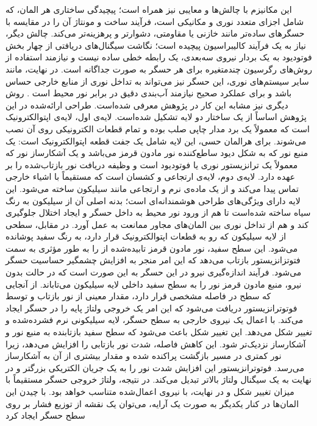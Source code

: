 این مکانیزم با چالش‌ها و معایبی نیز همراه است؛ پیچیدگی ساختاری هر المان، که شامل اجزای متعدد نوری و مکانیکی است، فرآیند ساخت و مونتاژ آن را در مقایسه با حسگرهای ساده‌تر مانند خازنی یا مقاومتی، دشوارتر و پرهزینه‌تر می‌کند. چالش دیگر، نیاز به یک فرآیند کالیبراسیون پیچیده است؛ نگاشت سیگنال‌های دریافتی از چهار بخش فوتودیود به یک بردار نیروی سه‌بعدی، یک رابطه خطی ساده نیست و نیازمند استفاده از روش‌های رگرسیون چندمتغیره برای هر حسگر به صورت جداگانه است. در نهایت، مانند سایر سیستم‌های نوری، این حسگر نیز می‌تواند به تداخل نوری از منابع خارجی حساس باشد و برای عملکرد صحیح نیازمند آب‌بندی دقیق در برابر نور محیط است
\cite{khamis_novel_2019}.
روش دیگری نیز مشابه این کار در پژوهش 
\cite{costanzo2021optical}
 معرفی شده‌است. طراحی ارائه‌شده در این پژوهش اساساً از یک ساختار دو لایه تشکیل شده‌است. لایه‌ی اول، لایه‌ی اپتوالکترونیک 
   است که معمولاً یک برد مدار چاپی صلب بوده و تمام قطعات الکترونیکی روی آن نصب می‌شوند. برای هرالمان حسی، این لایه شامل یک جفت قطعه اپتوالکترونیک است: یک منبع نور که به شکل دیود ساطع‌کننده نور مادون قرمز می‌باشد و یک آشکارساز نور که معمولاً یک ترانزیستور نوری
    یا فوتودیود است و وظیفه دریافت نور بازتاب‌‌شده را بر عهده دارد.
 لایه‌ی دوم، لایه‌ی ارتجاعی و کشسان است که مستقیماً با اشیاء خارجی تماس پیدا می‌کند و از یک ماده‌ی نرم و ارتجاعی مانند سیلیکون ساخته می‌شود. این لایه دارای ویژگی‌های طراحی هوشمندانه‌ای است؛ بدنه اصلی آن از سیلیکون به رنگ سیاه ساخته شده‌است تا هم از ورود نور محیط به داخل حسگر و ایجاد اختلال جلوگیری کند و هم از تداخل نوری
   بین المان‌های مجاور ممانعت به عمل آورد. در مقابل، سطحی از لایه سیلیکون که رو به قطعات اپتوالکترونیک قرار دارد، به رنگ سفید پوشانده می‌شود. این سطح سفید، نور مادون قرمز تابیده‌شده از  را به طور مؤثری به سمت فتوتزانزیستور بازتاب می‌دهد که این امر منجر به افزایش چشمگیر حساسیت حسگر می‌شود.
 فرآیند اندازه‌گیری نیرو در این حسگر به این صورت است که در حالت بدون نیرو، منبع مادون قرمز نور را به سطح سفید داخلی لایه سیلیکون می‌تاباند. از آنجایی که سطح در فاصله مشخصی قرار دارد، مقدار معینی از نور بازتاب و توسط فوتوترانزیستور دریافت می‌شود که این امر یک خروجی ولتاژ پایه را در حسگر ایجاد می‌کند. با اعمال یک نیروی خارجی به سطح حسگر، لایه سیلیکونی نرم فشرده‌شده و تغییر شکل می‌دهد. این تغییر شکل باعث می‌شود که سطح سفید بازتابنده به منبع نور و آشکارساز نزدیک‌تر شود. این کاهش فاصله، شدت نور بازتابی را افزایش می‌دهد، زیرا نور کمتری در مسیر بازگشت پراکنده شده و مقدار بیشتری از آن به آشکارساز می‌رسد. فوتوترانزیستور این افزایش شدت نور را به یک جریان الکتریکی بزرگتر و در نهایت به یک سیگنال ولتاژ بالاتر تبدیل می‌کند. در نتیجه، ولتاژ خروجی حسگر مستقیماً با میزان تغییر شکل و در نهایت، با نیروی اعمال‌شده متناسب خواهد بود. با چیدن این المان‌ها در کنار یکدیگر به صورت یک آرایه، می‌توان یک نقشه از توزیع فشار بر روی سطح حسگر ایجاد کرد
